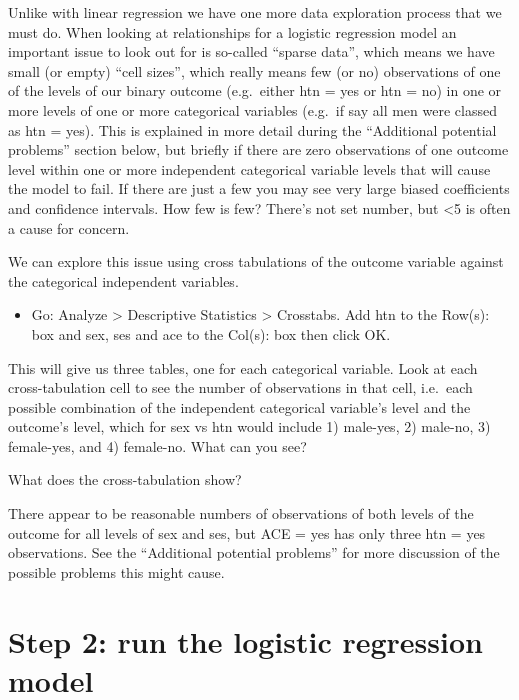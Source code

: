 \documentclass[
]{book}
\providecommand{\tightlist}{%
  \setlength{\itemsep}{0pt}\setlength{\parskip}{0pt}}
\begin{document}
Unlike with linear regression we have one more data exploration process that we must do. When looking at relationships for a logistic regression model an important issue to look out for is so-called ``sparse data'', which means we have small (or empty) ``cell sizes'', which really means few (or no) observations of one of the levels of our binary outcome (e.g.~either htn = yes or htn = no) in one or more levels of one or more categorical variables (e.g.~if say all men were classed as htn = yes). This is explained in more detail during the ``Additional potential problems'' section below, but briefly if there are zero observations of one outcome level within one or more independent categorical variable levels that will cause the model to fail. If there are just a few you may see very large biased coefficients and confidence intervals. How few is few? There's not set number, but \textless5 is often a cause for concern.

We can explore this issue using cross tabulations of the outcome variable against the categorical independent variables.

\begin{itemize}
\tightlist
\item
  Go: Analyze \textgreater{} Descriptive Statistics \textgreater{} Crosstabs. Add htn to the Row(s): box and sex, ses and ace to the Col(s): box then click OK.
\end{itemize}

This will give us three tables, one for each categorical variable. Look at each cross-tabulation cell to see the number of observations in that cell, i.e.~each possible combination of the independent categorical variable's level and the outcome's level, which for sex vs htn would include 1) male-yes, 2) male-no, 3) female-yes, and 4) female-no. What can you see?

What does the cross-tabulation show?

There appear to be reasonable numbers of observations of both levels of the outcome for all levels of sex and ses, but ACE = yes has only three htn = yes observations. See the ``Additional potential problems'' for more discussion of the possible problems this might cause.

\hypertarget{step-2-run-the-logistic-regression-model}{%
\section{Step 2: run the logistic regression model}\label{step-2-run-the-logistic-regression-model}}
\end{document}
